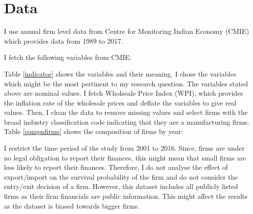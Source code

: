 \documentclass[11pt]{article}
\begin{document}
\section{Data}\label{sec:data}
I use annual firm level data from Centre for Monitoring Indian Economy
(CMIE) which provides  data from 1989 to 2017. 

I fetch the following variables from CMIE: 

\begin{center}

\end{center}

Table \ref{indicator} shows the variables and their meaning. I chose the variables
which might be the most pertinent to my research question. 
The variables stated above are nominal values. I fetch Wholseale Price
Index (WPI), which provides the inflation rate of the wholesale prices
and deflate the variables to give real values. Then, I clean the data
to remove missing values and select firms with the broad industry
classification code indicating that they are a manufacturing
firms. Table \ref{compnfirms} shows the composition of firms by year: 
\begin{center}

\end{center}
 I restrict the time period of the study from 2001 to 2016.  Since, firms
are under no legal obligation to report their finances, this might
mean  that small firms are less likely to report their
finances. Therefore, I do not analyse the effect of export/import on
the survival probability of the firm and do not consider the
entry/exit decision of a firm. 
 However, this dataset includes all publicly listed firms as
their firm financials are public information. This might affect the 
results as the dataset is biased towards bigger firms. 
\end{document}

